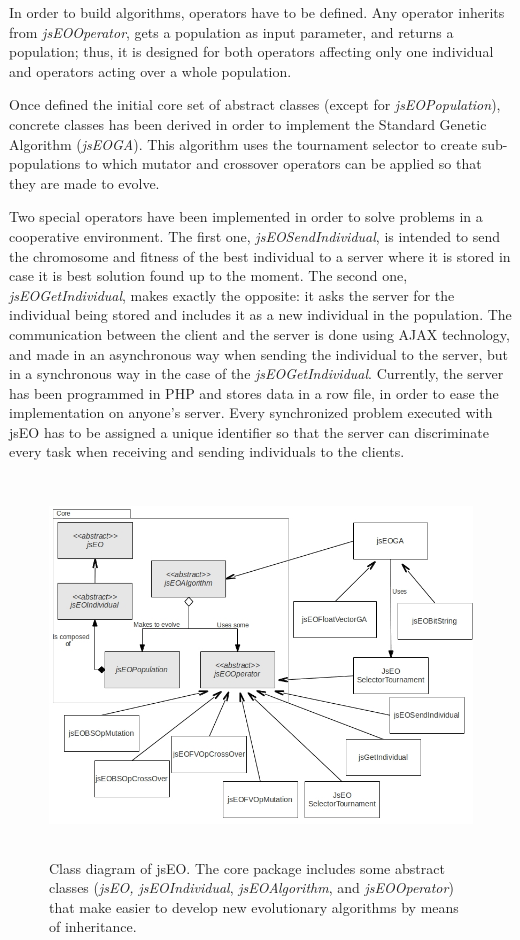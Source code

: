 \documentclass[runningheads,a4paper]{llncs}
\begin{document}
In order to build algorithms, operators have to be defined. Any operator inherits from \textit{jsEOOperator}, gets a population as input parameter, and returns a population; thus, it is designed for both operators affecting only one individual and operators acting over a whole population.

Once defined the initial core set of abstract classes (except for \textit{jsEOPopulation}), concrete classes has been derived in order to implement the Standard Genetic Algorithm (\textit{jsEOGA}). This algorithm uses the tournament selector to create sub-populations to which mutator and crossover operators can be applied so that they are made to evolve.

Two special operators have been implemented in order to solve problems in a cooperative environment. The first one, \textit{jsEOSendIndividual}, is intended to send the chromosome and fitness of the best individual to a server where it is stored in case it is best solution found up to the moment. The second one, \textit{jsEOGetIndividual}, makes exactly the opposite: it asks the server for the individual being stored and includes it as a new individual in the population. The communication between the client and the server is done using AJAX technology, and made in an asynchronous way when sending the individual to the server, but in a synchronous way in the case of the \textit{jsEOGetIndividual}. Currently, the server has been programmed in PHP and stores data in a row file, in order to ease the implementation on anyone's server. Every synchronized problem executed with jsEO has to be assigned a unique identifier so that the server can discriminate every task when receiving and sending individuals to the clients.

\begin{figure}
\centering
\includegraphics[height=10cm]{class-diagram}
\caption{Class diagram of jsEO. The core package includes some abstract classes (\textit{jsEO, jsEOIndividual}, \textit{jsEOAlgorithm}, and \textit{jsEOOperator}) that make easier to develop new evolutionary algorithms by means of inheritance.}
\label{fig:jsEO-class-diagram}
\end{figure}
\end{document}
